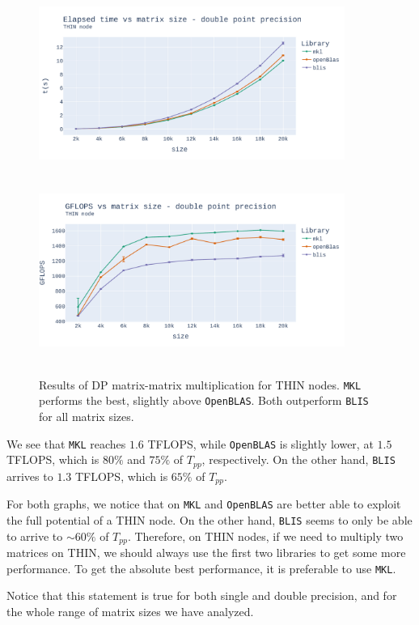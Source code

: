 \documentclass{report}
\begin{document}
\begin{figure}[h!]
\hspace*{-2.5cm}
\includegraphics[width=10cm, height=6cm]{./images/fixed_cores_thin_double_time.pdf}
\includegraphics[width=10cm, height=6cm]{./images/fixed_cores_thin_double_gflops.pdf}
\caption{\label{fig:fixed_cores_thin_double} Results of DP matrix-matrix multiplication 
for THIN nodes. \texttt{MKL} performs the best, slightly above \texttt{OpenBLAS}. 
Both outperform \texttt{BLIS} for all matrix sizes.}
\end{figure}
We see that \texttt{MKL} reaches $1.6$ TFLOPS, 
while \texttt{OpenBLAS} is slightly lower, at $1.5$ TFLOPS, which is $80\%$ and 
$75\%$ of $T_{pp}$, respectively. On the other hand, \texttt{BLIS} arrives to 
$1.3$ TFLOPS, which is $65\%$ of $T_{pp}$.

For both graphs, we notice that on \texttt{MKL} and \texttt{OpenBLAS} are better 
able to exploit the full potential of a THIN node. On the other hand, \texttt{BLIS}
seems to only be able to arrive to $\sim 60\%$ of $T_{pp}$. Therefore, on THIN nodes, 
if we need to multiply two matrices on THIN, we should always use the first 
two libraries to get some more performance. To get the absolute best performance, 
it is preferable to use \texttt{MKL}.

Notice that this statement is true for both single and double precision, and for 
the whole range of matrix sizes we have analyzed. 
\end{document}
